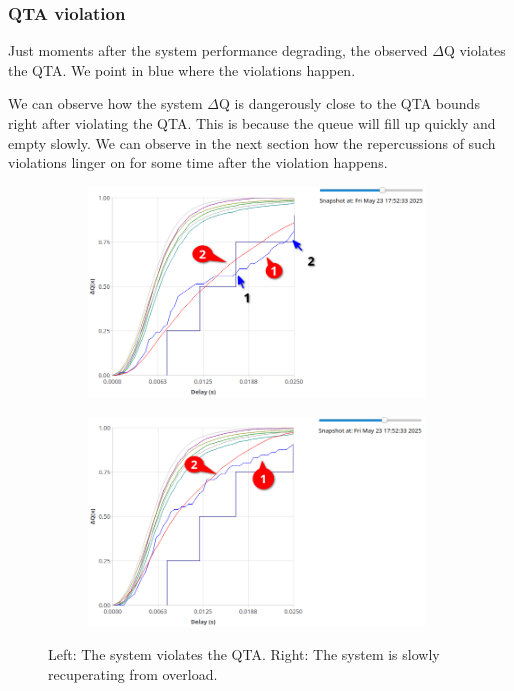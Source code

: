         \subsubsection{QTA violation}
            Just moments after the system performance degrading, the observed $\Delta$Q violates the QTA. We point in blue where the violations happen.

            We can observe how the system $\Delta$Q is dangerously close to the QTA bounds right after violating the QTA. This is because the queue will fill up quickly and empty slowly. We can observe in the next section how the repercussions of such violations linger on for some time after the violation happens.
            \begin{figure}[H]
            \centering
            \begin{subfigure}{.5\textwidth}
                \centering
                \includegraphics[width=0.98\textwidth]{img/violation1.png}
                \label{fig:violat_1}
            \end{subfigure}%
            \begin{subfigure}{.5\textwidth}
                \centering
                \includegraphics[width =0.98\textwidth]{img/right_after1.png}
                \label{fig:violat_2}
            \end{subfigure}
            \label{fig:violat}
                \caption{Left: The system violates the QTA. Right: The system is slowly recuperating from overload.}
            \end{figure}
 

